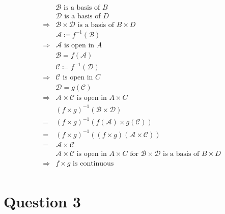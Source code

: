 \documentclass{article}
\begin{document}
\begin{equation*}
    \begin{split}
        &\mathcal{B}\text{ is a basis of }B\\
        &\mathcal{D}\text{ is a basis of }D\\
        \Rightarrow&\mathcal{B} \times\mathcal{D} \text{ is a basis of }B\times D\\
        &\mathcal{A}\coloneqq f^{-1}(\mathcal{B})\\
        \Rightarrow&\mathcal{A}\text{ is open in }A\\
        &\mathcal{B}=f(\mathcal{A})\\
        &\mathcal{C}\coloneqq f^{-1}(\mathcal{D})\\
        \Rightarrow&\mathcal{C}\text{ is open in }C\\
        &\mathcal{D}=g(\mathcal{C})\\
        \Rightarrow&\mathcal{A}\times\mathcal{C}\text{ is open in }A\times C\\
        &(f\times g)^{-1}(\mathcal{B} \times\mathcal{D} )\\
        =&(f\times g)^{-1}(f(\mathcal{A})\times g(\mathcal{C}))\\
        =&(f\times g)^{-1}((f\times g)(\mathcal{A} \times\mathcal{C} ))\\
        =&\mathcal{A} \times\mathcal{C} \\
        &\mathcal{A}\times\mathcal{C}\text{ is open in }A\times C\text{ for }\mathcal{B} \times\mathcal{D}\text{ is a basis of }B\times D\\
        \Rightarrow&f\times g\text{ is continuous}\\
    \end{split}
\end{equation*}

\newpage

\section*{Question 3}

~
\end{document}
